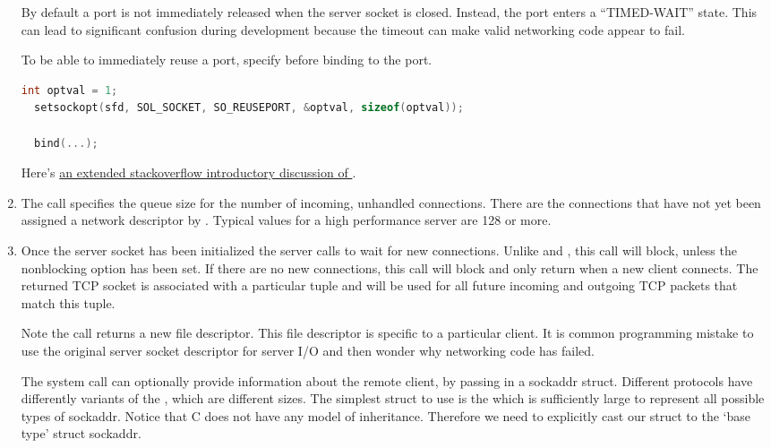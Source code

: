 \begin{enumerate}
  By default a port is not immediately released when the server socket is closed.
  Instead, the port enters a ``TIMED-WAIT'' state.
  This can lead to significant confusion during development because the timeout can make valid networking code appear to fail.

  To be able to immediately reuse a port, specify  before binding to the port.

  \begin{lstlisting}[language=C]
  int optval = 1;
  setsockopt(sfd, SOL_SOCKET, SO_REUSEPORT, &optval, sizeof(optval));

  bind(...);
  \end{lstlisting}

  Here's \href{http://stackoverflow.com/questions/14388706/socket-options-so-reuseaddr-and-so-reuseport-how-do-they-differ-do-they-mean-t}{an extended stackoverflow introductory discussion of }.

  \item {}

    The  call specifies the queue size for the number of incoming, unhandled connections.
    There are the connections that have not yet been assigned a network descriptor by .
    Typical values for a high performance server are 128 or more.

  \item {}

  Once the server socket has been initialized the server calls  to wait for new connections.
  Unlike   and , this call will block, unless the nonblocking option has been set.
  If there are no new connections, this call will block and only return when a new client connects.
  The returned TCP socket is associated with a particular tuple  and will be used for all future incoming and outgoing TCP packets that match this tuple.

  Note the  call returns a new file descriptor.
  This file descriptor is specific to a particular client.
  It is common programming mistake to use the original server socket descriptor for server I/O and then wonder why networking code has failed.

  The  system call can optionally provide information about the remote client, by passing in a sockaddr struct.
  Different protocols have differently variants of the , which are different sizes.
  The simplest struct to use is the  which is sufficiently large to represent all possible types of sockaddr.
  Notice that C does not have any model of inheritance.
  Therefore we need to explicitly cast our struct to the `base type' struct sockaddr.


\end{enumerate}
